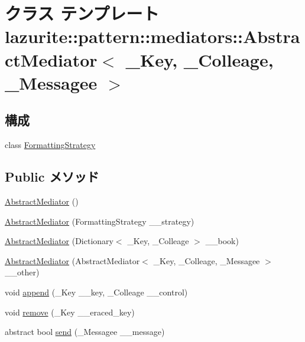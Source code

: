 \hypertarget{classlazurite_1_1pattern_1_1mediators_1_1_abstract_mediator_3_01___key_00_01___colleage_00_01___messagee_01_4}{
\section{クラス テンプレート lazurite::pattern::mediators::AbstractMediator$<$ \_\-Key, \_\-Colleage, \_\-Messagee $>$}
\label{classlazurite_1_1pattern_1_1mediators_1_1_abstract_mediator_3_01___key_00_01___colleage_00_01___messagee_01_4}
}
\subsection*{構成}
\begin{DoxyCompactItemize}
\item 
class \hyperlink{classlazurite_1_1pattern_1_1mediators_1_1_abstract_mediator_3_01___key_00_01___colleage_00_01___05d0f5dbbad2bc6db18831464bc366e3}{FormattingStrategy}
\end{DoxyCompactItemize}
\subsection*{Public メソッド}
\begin{DoxyCompactItemize}
\item 
\hyperlink{classlazurite_1_1pattern_1_1mediators_1_1_abstract_mediator_3_01___key_00_01___colleage_00_01___messagee_01_4_a008697ddfb30705dc7e2e535f0affd20}{AbstractMediator} ()
\item 
\hyperlink{classlazurite_1_1pattern_1_1mediators_1_1_abstract_mediator_3_01___key_00_01___colleage_00_01___messagee_01_4_a0de22ca46bae1588af449a71f5d548f4}{AbstractMediator} (FormattingStrategy \_\-\_\-strategy)
\item 
\hyperlink{classlazurite_1_1pattern_1_1mediators_1_1_abstract_mediator_3_01___key_00_01___colleage_00_01___messagee_01_4_aae9c4ede6d686f3d101ca3acb96023fa}{AbstractMediator} (Dictionary$<$ \_\-Key, \_\-Colleage $>$ \_\-\_\-book)
\item 
\hyperlink{classlazurite_1_1pattern_1_1mediators_1_1_abstract_mediator_3_01___key_00_01___colleage_00_01___messagee_01_4_a2b93c855a87570583da80c1a6c3a7f1b}{AbstractMediator} (AbstractMediator$<$ \_\-Key, \_\-Colleage, \_\-Messagee $>$ \_\-\_\-other)
\item 
void \hyperlink{classlazurite_1_1pattern_1_1mediators_1_1_abstract_mediator_3_01___key_00_01___colleage_00_01___messagee_01_4_a3afba7c48f75db3155a7f951a2028692}{append} (\_\-Key \_\-\_\-key, \_\-Colleage \_\-\_\-control)
\item 
void \hyperlink{classlazurite_1_1pattern_1_1mediators_1_1_abstract_mediator_3_01___key_00_01___colleage_00_01___messagee_01_4_a7cd38d94a7ed5d3d5584dff30e482811}{remove} (\_\-Key \_\-\_\-eraced\_\-key)
\item 
abstract bool \hyperlink{classlazurite_1_1pattern_1_1mediators_1_1_abstract_mediator_3_01___key_00_01___colleage_00_01___messagee_01_4_a01ffda0e485054adb68cf914142c66a0}{send} (\_\-Messagee \_\-\_\-message)
\end{DoxyCompactItemize}
